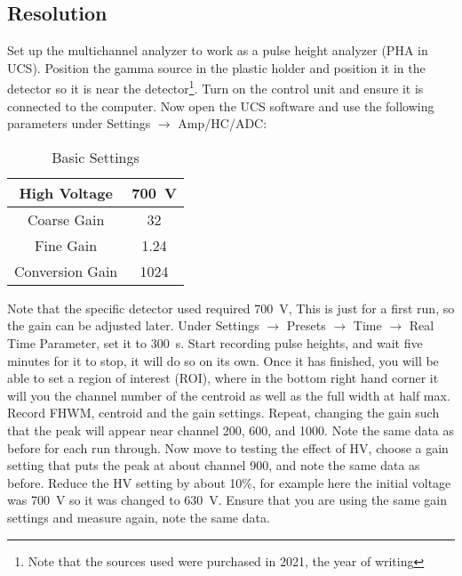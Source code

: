 \documentclass[letterpaper,12pt]{article}
\begin{document}
\subsection{Resolution}
Set up the multichannel analyzer to work as a pulse height analyzer (PHA in UCS). Position the gamma source in the plastic holder and position it in the detector so it is near the detector\footnote{Note that the sources used were purchased in 2021, the year of writing}. Turn on the control unit and ensure it is connected to the computer. Now open the UCS software and use the following parameters under Settings $\rightarrow$ Amp/HC/ADC:
\begin{table}[H]
  \centering
  \begin{tabular}{|c|c|}
    \hline
    High Voltage & \SI{700}{\volt} \\\hline
    Coarse Gain & 32 \\\hline
    Fine Gain & 1.24 \\\hline
    Conversion Gain & 1024 \\\hline 
  \end{tabular}
  \caption{Basic Settings}
  \label{tab:1}
\end{table}
Note that the specific detector used required \SI{700}{\volt}, This is just for a first run, so the gain can be adjusted later. Under Settings $\rightarrow$ Presets $\rightarrow$ Time $\rightarrow$ Real Time Parameter, set it to \SI{300}{\s}. Start recording pulse heights, and wait five minutes for it to stop, it will do so on its own. Once it has finished, you will be able to set a region of interest (ROI), where in the bottom right hand corner it will you the channel number of the centroid as well as the full width at half max. Record FHWM, centroid and the gain settings. Repeat, changing the gain such that the peak will appear near channel 200, 600, and 1000. Note the same data as before for each run through. Now move to testing the effect of HV, choose a gain setting that puts the peak at about channel 900, and note the same data as before. Reduce the HV setting by about 10\%, for example here the initial voltage was \SI{700}{\volt} so it was changed to \SI{630}{\volt}. Ensure that you are using the same gain settings and measure again, note the same data.  
\end{document}
